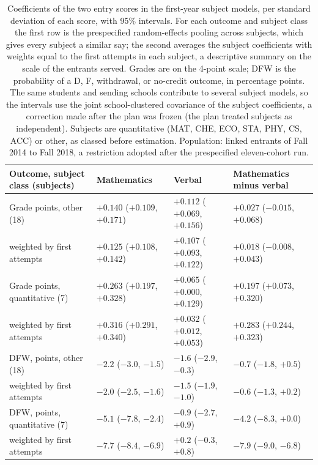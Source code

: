 \begin{table}[tbp]
\centering\footnotesize
\setlength{\tabcolsep}{4pt}
\caption{Coefficients of the two entry scores in the
  first-year subject models, per standard deviation of each score,
  with 95\% intervals. For each outcome and subject class the
  first row is the prespecified random-effects pooling across
  subjects, which gives every subject a similar say; the second
  averages the subject coefficients with weights equal to the
  first attempts in each subject, a descriptive summary on the
  scale of the entrants served.
  Grades are on the 4-point scale; DFW is the probability of a D,
  F, withdrawal, or no-credit outcome, in percentage points.
  The same students and sending schools contribute to several
  subject models, so the intervals use the joint school-clustered
  covariance of the subject coefficients, a correction made after
  the plan was frozen (the plan treated subjects as independent).
  Subjects are quantitative (MAT, CHE, ECO, STA, PHY, CS, ACC) or
  other, as classed before estimation. Population: linked
  entrants of Fall 2014 to Fall
  2018, a restriction adopted after
  the prespecified eleven-cohort run.}
\label{tab:subjectpooled}
\begin{tabular}{@{}llll@{}}
\toprule
Outcome, subject class (subjects) & Mathematics & Verbal & Mathematics minus verbal \\
\midrule
Grade points, other (18) & $+0.140$ {\scriptsize($+0.109$, $+0.171$)} & $+0.112$ {\scriptsize($+0.069$, $+0.156$)} & $+0.027$ {\scriptsize($-0.015$, $+0.068$)} \\
\quad weighted by first attempts & $+0.125$ {\scriptsize($+0.108$, $+0.142$)} & $+0.107$ {\scriptsize($+0.093$, $+0.122$)} & $+0.018$ {\scriptsize($-0.008$, $+0.043$)} \\
Grade points, quantitative (7) & $+0.263$ {\scriptsize($+0.197$, $+0.328$)} & $+0.065$ {\scriptsize($+0.000$, $+0.129$)} & $+0.197$ {\scriptsize($+0.073$, $+0.320$)} \\
\quad weighted by first attempts & $+0.316$ {\scriptsize($+0.291$, $+0.340$)} & $+0.032$ {\scriptsize($+0.012$, $+0.053$)} & $+0.283$ {\scriptsize($+0.244$, $+0.323$)} \\
DFW, points, other (18) & $-2.2$ {\scriptsize($-3.0$, $-1.5$)} & $-1.6$ {\scriptsize($-2.9$, $-0.3$)} & $-0.7$ {\scriptsize($-1.8$, $+0.5$)} \\
\quad weighted by first attempts & $-2.0$ {\scriptsize($-2.5$, $-1.6$)} & $-1.5$ {\scriptsize($-1.9$, $-1.0$)} & $-0.6$ {\scriptsize($-1.3$, $+0.2$)} \\
DFW, points, quantitative (7) & $-5.1$ {\scriptsize($-7.8$, $-2.4$)} & $-0.9$ {\scriptsize($-2.7$, $+0.9$)} & $-4.2$ {\scriptsize($-8.3$, $+0.0$)} \\
\quad weighted by first attempts & $-7.7$ {\scriptsize($-8.4$, $-6.9$)} & $+0.2$ {\scriptsize($-0.3$, $+0.8$)} & $-7.9$ {\scriptsize($-9.0$, $-6.8$)} \\
\bottomrule
\end{tabular}
\end{table}
